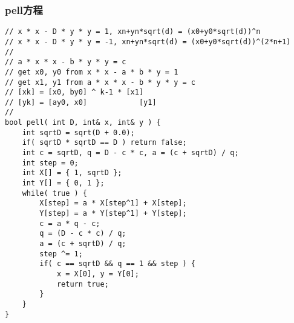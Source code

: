 \subsubsection{pell方程}
\begin{verbatim}
// x * x - D * y * y = 1, xn+yn*sqrt(d) = (x0+y0*sqrt(d))^n
// x * x - D * y * y = -1, xn+yn*sqrt(d) = (x0+y0*sqrt(d))^(2*n+1)
//
// a * x * x - b * y * y = c 
// get x0, y0 from x * x - a * b * y = 1
// get x1, y1 from a * x * x - b * y * y = c
// [xk] = [x0, by0] ^ k-1 * [x1]
// [yk] = [ay0, x0]            [y1]
//
bool pell( int D, int& x, int& y ) {  
    int sqrtD = sqrt(D + 0.0);  
    if( sqrtD * sqrtD == D ) return false;  
    int c = sqrtD, q = D - c * c, a = (c + sqrtD) / q;  
    int step = 0;  
    int X[] = { 1, sqrtD };  
    int Y[] = { 0, 1 };  
    while( true ) {  
        X[step] = a * X[step^1] + X[step];  
        Y[step] = a * Y[step^1] + Y[step];  
        c = a * q - c;  
        q = (D - c * c) / q;  
        a = (c + sqrtD) / q;  
        step ^= 1;  
        if( c == sqrtD && q == 1 && step ) {  
            x = X[0], y = Y[0];  
            return true;  
        }  
    }  
}
\end{verbatim}
